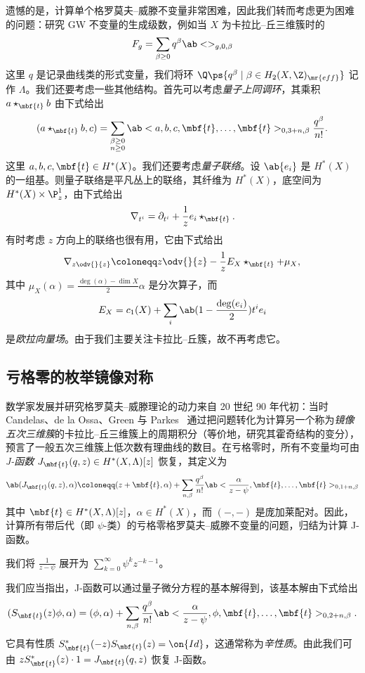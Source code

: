 遗憾的是，计算单个格罗莫夫–威滕不变量非常困难，因此我们转而考虑更为困难的问题：研究 GW 不变量的生成级数，例如当 \(X\) 为卡拉比–丘三维簇时的
\[ F_g = \sum_{\beta \geq 0} q^{\beta} \ab<>_{g,0,\beta} \]
这里 \(q\) 是记录曲线类的形式变量，我们将环 \(\Q\ps{q^{\beta} \mid \beta \in H_2(X, \Z)_{\mr{eff}}}\) 记作 \(\Lambda\)。我们还要考虑一些其他结构。首先可以考虑\textit{量子上同调环}，其乘积 \(a \star_{\mbf{t}} b\) 由下式给出
\[
    (a \star_{\mbf{t}} b, c) = \sum_{\substack{\beta \geq 0 \\ n \geq 0}} \ab<a,b,c, \mbf{t}, \ldots, \mbf{t}>_{0,3+n,\beta} \frac{q^{\beta}}{n!}.
\]
这里 \(a,b,c, \mbf{t} \in H^*(X)\)。我们还要考虑\textit{量子联络}。设 \(\ab\{ e_i \}\) 是 \(H^*(X)\) 的一组基。则量子联络是平凡丛上的联络，其纤维为 \(H^*(X)\)，底空间为 \(H^*(X) \times \P^1_z\)，由下式给出
\[ \nabla_{t^i} = \partial_{t^i} + \frac{1}{z} e_i \star_{\mbf{t}}. \]
有时考虑 \(z\) 方向上的联络也很有用，它由下式给出
\[ \nabla_{z \odv{}{z}} \coloneqq z \odv{}{z} - \frac{1}{z} E_X \star_{\mbf{t}} + \mu_X, \]
其中 \(\mu_X(\alpha) = \frac{\deg(\alpha) - \dim X}{2} \alpha\) 是分次算子，而
\[ E_X = c_1(X) + \sum_i \ab(1 - \frac{\deg(e_i)}{2})t^i e_i \]
是\textit{欧拉向量场}。由于我们主要关注卡拉比–丘簇，故不再考虑它。

\subsection{亏格零的枚举镜像对称}%
\label{sub:Enumerative mirror symmetry in genus zero}

数学家发展并研究格罗莫夫–威滕理论的动力来自 20 世纪 90 年代初：当时 Candelas、de la Ossa、Green 与 Parkes~\cite{CandelasEtAl1991} 通过把问题转化为计算另一个称为\textit{镜像五次三维簇}的卡拉比–丘三维簇上的周期积分（等价地，研究其霍奇结构的变分），预言了一般五次三维簇上低次数有理曲线的数目。在亏格零时，所有不变量均可由\textit{J-函数} \(J_{\mbf{t}}(q,z) \in H^*(X, \Lambda)[z]\) 恢复，其定义为
\[ \ab( J_{\mbf{t}}(q, z), \alpha ) \coloneqq (z + \mbf{t}, \alpha) + \sum_{n, \beta} \frac{q^{\beta}}{n!} \ab< \frac{\alpha}{z-\psi}, \mbf{t}, \ldots, \mbf{t}>_{0,1+n, \beta} \]
其中 \(\mbf{t} \in H^*(X, \Lambda)[z]\)，\(\alpha \in H^*(X)\)，而 \((-,-)\) 是庞加莱配对。因此，计算所有带后代（即 \(\psi\)-类）的亏格零格罗莫夫–威滕不变量的问题，归结为计算 J-函数。

\begin{rmk}
    我们将 \(\frac{1}{z-\psi}\) 展开为 \(\sum_{k=0}^{\infty} \psi^k z^{-k-1}\)。  
\end{rmk}

我们应当指出，J-函数可以通过量子微分方程的基本解得到，该基本解由下式给出
\[ ( S_{\mbf{t}}(z) \phi , \alpha) = (\phi, \alpha) + \sum_{n, \beta} \frac{q^{\beta}}{n!} \ab<\frac{\alpha}{z-\psi}, \phi, \mbf{t}, \ldots, \mbf{t}>_{0, 2+n, \beta}. \]
它具有性质 \(S_{\mbf{t}}^*(-z) S_{\mbf{t}}(z) = \on{Id}\)，这通常称为\textit{辛性质}。由此我们可由 \(z S_{\mbf{t}}^*(z)\cdot 1 = J_{\mbf{t}}(q, z)\) 恢复 J-函数。

